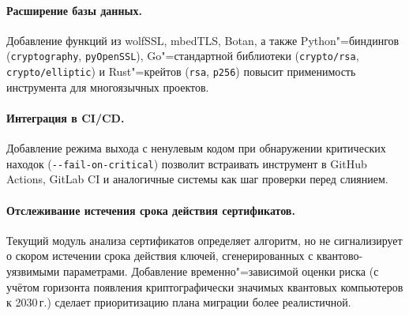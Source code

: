 \paragraph{Расширение базы данных.}
Добавление функций из wolfSSL, mbedTLS, Botan, а также Python"=биндингов
(\texttt{cryptography}, \texttt{pyOpenSSL}), Go"=стандартной библиотеки
(\texttt{crypto/rsa}, \texttt{crypto/elliptic}) и Rust"=крейтов
(\texttt{rsa}, \texttt{p256}) повысит применимость инструмента для
многоязычных проектов.

\paragraph{Интеграция в CI/CD.}
Добавление режима выхода с ненулевым кодом при обнаружении критических
находок (\texttt{{-}{-}fail-on-critical}) позволит встраивать инструмент
в GitHub Actions, GitLab CI и аналогичные системы как шаг проверки
перед слиянием.

\paragraph{Отслеживание истечения срока действия сертификатов.}
Текущий модуль анализа сертификатов определяет алгоритм, но не
сигнализирует о скором истечении срока действия ключей,
сгенерированных с квантово-уязвимыми параметрами.
Добавление временно"=зависимой оценки риска (с учётом горизонта
появления криптографически значимых квантовых компьютеров к 2030\,г.)
сделает приоритизацию плана миграции более реалистичной.
